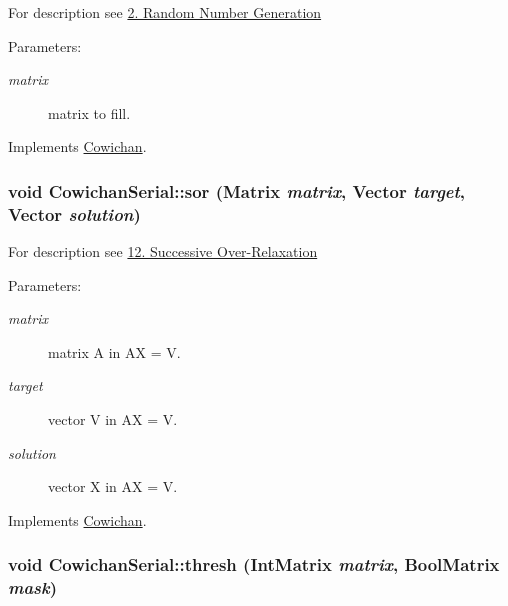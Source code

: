 For description see \hyperlink{index_randmat_sec}{2. Random Number Generation} \begin{Desc}
\item[Parameters:]
\begin{description}
\item[{\em matrix}]matrix to fill. \end{description}
\end{Desc}


Implements \hyperlink{class_cowichan_c44cacf9d9e363a5b076bcee8b9a7a73}{Cowichan}.\hypertarget{class_cowichan_serial_6e8b06711d976de1adc1e4dc81e560e5}{
\subsubsection[{sor}]{\setlength{\rightskip}{0pt plus 5cm}void CowichanSerial::sor ({\bf Matrix} {\em matrix}, \/  {\bf Vector} {\em target}, \/  {\bf Vector} {\em solution})}}
\label{class_cowichan_serial_6e8b06711d976de1adc1e4dc81e560e5}


For description see \hyperlink{index_sor_sec}{12. Successive Over-Relaxation} \begin{Desc}
\item[Parameters:]
\begin{description}
\item[{\em matrix}]matrix A in AX = V. \item[{\em target}]vector V in AX = V. \item[{\em solution}]vector X in AX = V. \end{description}
\end{Desc}


Implements \hyperlink{class_cowichan_92d8d9ae77208115fdfe69e1174f601c}{Cowichan}.\hypertarget{class_cowichan_serial_7c0f93b2099ce919f91b5d953ff76511}{
\subsubsection[{thresh}]{\setlength{\rightskip}{0pt plus 5cm}void CowichanSerial::thresh ({\bf IntMatrix} {\em matrix}, \/  {\bf BoolMatrix} {\em mask})}}
\label{class_cowichan_serial_7c0f93b2099ce919f91b5d953ff76511}



